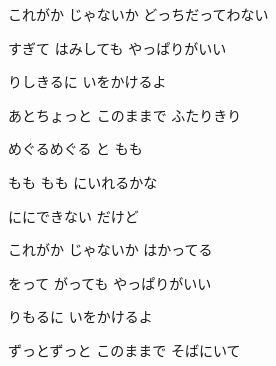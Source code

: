\documentclass[14pt]{ltjsarticle}
\begin{document}
{\item
  これがか じゃないか どっちだってわない
  \jisho{}

  すぎて はみしても やっぱりがいい
  \jisho{}

  りしきるに いをかけるよ
  \jisho{}

  あとちょっと このままで ふたりきり
  \jisho{}

\item
  めぐるめぐる と もも
  \jisho{}

  もも もも にいれるかな
  \jisho{}

  ににできない だけど
  \jisho{}

\item
  これがか じゃないか はかってる
  \jisho{}

  をって がっても やっぱりがいい
  \jisho{}

  りもるに いをかけるよ
  \jisho{}

  ずっとずっと このままで そばにいて
  \jisho{}


}
\end{document}
